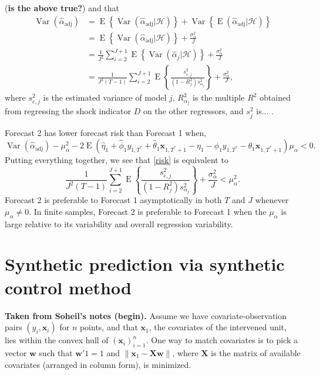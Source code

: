 \documentclass[11pt]{article}
\newcommand{\w}{\textbf{w}}
\newcommand{\x}{\textbf{x}}
\newcommand{\X}{\textbf{X}}
\newcommand{\Hist}{\mathcal{H}}
\newcommand{\norm}[1]{\left\lVert#1\right\rVert}
\DeclareMathOperator{\E}{E}
\DeclareMathOperator{\Var}{Var}
\begin{document}
(\textbf{is the above true?}) and that 
\begin{align*}
  \Var(\hat{\alpha}_{\text{adj}}) &= \E\left\{\Var(\hat{\alpha}_{\text{adj}}|\Hist)\right\} 
    + \Var\left\{\E(\hat{\alpha}_{\text{adj}}|\Hist)\right\} \\
  &= \E\left\{\Var(\hat{\alpha}_{\text{adj}}|\Hist)\right\} + \frac{\sigma_{\alpha}^2}{J} \\
  &= \frac{1}{J^2} \sum_{i=2}^{J+1} \E\left\{\Var(\hat{\alpha}_j|\Hist)\right\} + \frac{\sigma_{\alpha}^2}{J} \\
  &= \frac{1}{J^2(T-1)}\sum_{i=2}^{J+1} \E\left\{\frac{s_{e,j}^2}{(1-R^2_j)s_{\alpha_j}^2}\right\} 
    + \frac{\sigma_{\alpha}^2}{J},
\end{align*}
where $s_{e,j}^2$ is the estimated variance of model $j$, $R^2_{\alpha_j}$ is 
the multiple $R^2$ obtained from regressing the shock indicator $D$ on the 
other regressors, and $s_j^2$ is... .

Forecast 2 has lower forecast risk than Forecast 1 when,  
\begin{equation} \label{risk}
  \Var(\hat{\alpha}_{\text{adj}}) - \mu_{\alpha}^2 
    - 2\E\left(\hat\eta_1 + \hat\phi_1 y_{1,T^*} + \hat\theta_1 \x_{1,T^*+1} -\eta_1 - \phi_1 y_{1,T^*} 
      - \theta_1 \x_{1,T^*+1}\right)\mu_{\alpha} < 0.
\end{equation}
Putting everything together, we see that \eqref{risk} is equivalent to
$$
  \frac{1}{J^2(T-1)}\sum_{i=2}^{J+1} \E\left\{\frac{s_{e,j}^2}{(1-R^2_j)s_{\alpha_j}^2}\right\} 
    + \frac{\sigma_{\alpha}^2}{J} < \mu_{\alpha}^2.
$$
Forecast 2 is preferable to Forecast 1 asymptotically in both $T$ and $J$ 
whenever $\mu_{\alpha} \neq 0$. In finite samples, Forecast 2 is preferable to 
Forecast 1 when the $\mu_{\alpha}$ is large relative to its variability and 
overall regression variability.  














\section{Synthetic prediction via synthetic control method}


{\bf Taken from Soheil's notes (begin).}
Assume we have covariate-observation pairs $(y_i, \x_i)$ for $n$ points, and 
that $\x_1$, the covariates of the intervened unit, lies within the convex hull 
of $(\x_i)_{i=1}^n$. One way to match covariates is to pick a vector $\w$ such 
that $\w'1=1$ and $\norm{\x_1 - \X\w}$, where $\X$ is the matrix of available 
covariates (arranged in column form), is minimized.
\end{document}

